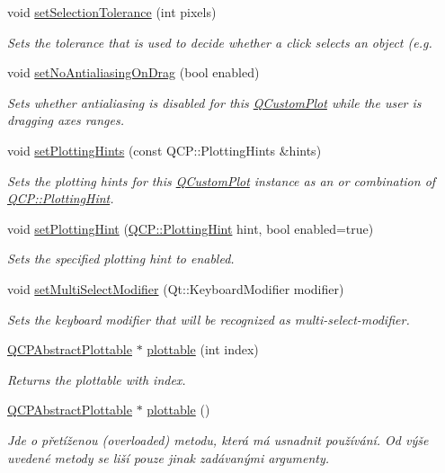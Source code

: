 \begin{DoxyCompactItemize}
void \hyperlink{classQCustomPlot_a4dc31241d7b09680950e19e5f971ed93}{set\+Selection\+Tolerance} (int pixels)
\begin{DoxyCompactList}\small\item\em Sets the tolerance that is used to decide whether a click selects an object (e.\+g. \end{DoxyCompactList}\item 
void \hyperlink{classQCustomPlot_a775bdcb6329d44701aeaa6135b0e5265}{set\+No\+Antialiasing\+On\+Drag} (bool enabled)
\begin{DoxyCompactList}\small\item\em Sets whether antialiasing is disabled for this \hyperlink{classQCustomPlot}{Q\+Custom\+Plot} while the user is dragging axes ranges. \end{DoxyCompactList}\item 
void \hyperlink{classQCustomPlot_a94a33cbdadbbac5934843508bcfc210d}{set\+Plotting\+Hints} (const Q\+C\+P\+::\+Plotting\+Hints \&hints)
\begin{DoxyCompactList}\small\item\em Sets the plotting hints for this \hyperlink{classQCustomPlot}{Q\+Custom\+Plot} instance as an {\itshape or} combination of \hyperlink{namespaceQCP_a5400e5fcb9528d92002ddb938c1f4ef4}{Q\+C\+P\+::\+Plotting\+Hint}. \end{DoxyCompactList}\item 
void \hyperlink{classQCustomPlot_a3b7c97bb6c16464e9e15190c07abe9a9}{set\+Plotting\+Hint} (\hyperlink{namespaceQCP_a5400e5fcb9528d92002ddb938c1f4ef4}{Q\+C\+P\+::\+Plotting\+Hint} hint, bool enabled=true)
\begin{DoxyCompactList}\small\item\em Sets the specified plotting {\itshape hint} to {\itshape enabled}. \end{DoxyCompactList}\item 
void \hyperlink{classQCustomPlot_a8fc96e3b5138a06759a2a90c166df516}{set\+Multi\+Select\+Modifier} (Qt\+::\+Keyboard\+Modifier modifier)
\begin{DoxyCompactList}\small\item\em Sets the keyboard modifier that will be recognized as multi-\/select-\/modifier. \end{DoxyCompactList}\item 
\hyperlink{classQCPAbstractPlottable}{Q\+C\+P\+Abstract\+Plottable} $\ast$ \hyperlink{classQCustomPlot_a32de81ff53e263e785b83b52ecd99d6f}{plottable} (int index)
\begin{DoxyCompactList}\small\item\em Returns the plottable with {\itshape index}. \end{DoxyCompactList}\item 
\hyperlink{classQCPAbstractPlottable}{Q\+C\+P\+Abstract\+Plottable} $\ast$ \hyperlink{classQCustomPlot_adea38bdc660da9412ba69fb939031567}{plottable} ()
\begin{DoxyCompactList}\small\item\em Jde o přetíženou (overloaded) metodu, která má usnadnit používání. Od výše uvedené metody se liší pouze jinak zadávanými argumenty.


\end{DoxyCompactList}
\end{DoxyCompactItemize}
